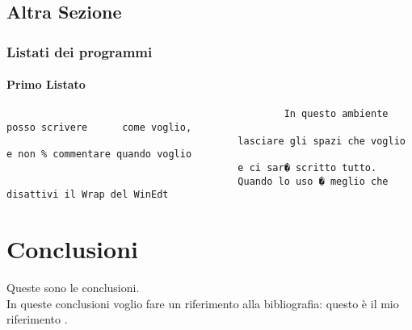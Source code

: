 \documentclass[12pt,a4paper,openright,twoside]{report}
\renewcommand{\chaptermark}[1]{\markboth{\thechapter.\ #1}{}}
\begin{document}
                                        \section{Altra Sezione}\label{sec:prova}%
                                        \subsection{Listati dei programmi}
                                        \subsubsection{Primo Listato}
                                        \begin{verbatim}
                                                In questo ambiente     posso scrivere      come voglio,
                                        lasciare gli spazi che voglio e non % commentare quando voglio
                                        e ci sar� scritto tutto.
                                        Quando lo uso � meglio che disattivi il Wrap del WinEdt
                                        \end{verbatim}
                                        \clearpage{\pagestyle{empty}\cleardoublepage}
                                        \chapter*{Conclusioni}
                                         Queste sono le
                                        conclusioni.\\
                                        In queste conclusioni voglio fare un riferimento alla
                                        bibliografia: questo \`e il mio riferimento \cite{K3,K4}.
                                        \renewcommand{\chaptermark}[1]{\markright{\thechapter \ #1}{}}
                                        \lhead[\fancyplain{}{\bfseries\thepage}]{\fancyplain{}{\bfseries\rightmark}}
                                        \appendix                               %
\end{document}
